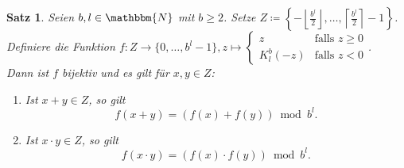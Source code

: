 \documentclass{article}
\newcommand{\N}{\mathbbm{N}} %
\newtheorem{satz}{Satz}
\begin{document}
  \begin{satz} \label{satz:Rechnen-Komplementdarstellung}
    Seien $b,l \in \N$ mit $b \geq 2$. Setze $Z \coloneq \left\{ - \left\lfloor \displaystyle\frac{b^l}{2} \right\rfloor , \dots, \left\lceil \displaystyle\frac{b^l}{2} \right\rceil -1 \right\}$.\\
    Definiere die Funktion $f \colon Z \to \{0, \dots, b^l-1\}, z \mapsto 
      \begin{cases}
        z &\text{falls } z \geq 0 \\
        K_l^b(-z) &\text{falls } z <0
      \end{cases}$.\\
    Dann ist $f$ bijektiv und es gilt für $x,y\in Z$:
    \begin{enumerate}[label=(\roman*)] 
      \item Ist $x+y \in Z$, so gilt 
        \[f(x+y) = (f(x) + f(y)) \bmod b^l.\] \label{satz:Rechnen-Komplementdarstellung_Addition}
      \item Ist $x \cdot y \in Z$, so gilt 
        \[f(x \cdot y) = (f(x) \cdot f(y)) \bmod b^l.\] \label{satz:Rechnen-Komplementdarstellung_Multiplikation}
    \end{enumerate}
  \end{satz}
\end{document}
